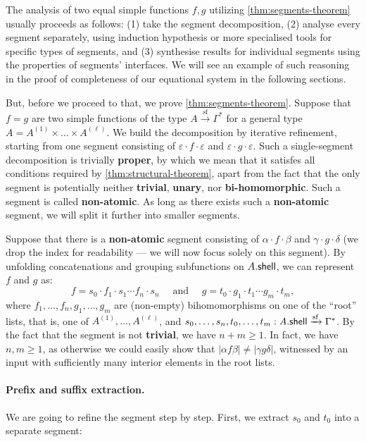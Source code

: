 The analysis of two equal simple functions $f,g$ utilizing \cref{thm:segments-theorem} usually proceeds as follows: (1) take the segment decomposition, (2) analyse every segment separately, using induction hypothesis or more specialised tools for specific types of segments, and (3) synthesise results for individual segments using the properties of segments' interfaces. We will see an example of such reasoning in the proof of completeness of our equational system in the following sections.

But, before we proceed to that, we prove \cref{thm:segments-theorem}. Suppose that $f = g$ are two simple functions of the type $A \xrightarrow{\mathrm{sf}} \Gamma^*$ for a general type $A = A^{(1)} \times \dots \times A^{(\ell)}$. We build the decomposition by iterative refinement, starting from one segment consisting of $\varepsilon \cdot f \cdot \varepsilon$ and $\varepsilon \cdot g \cdot \varepsilon$. Such a single-segment decomposition is trivially \textbf{proper}, by which we mean that it satisfes all conditions required by \cref{thm:structural-theorem}, apart from the fact that the only segment is potentially neither \textbf{trivial}, \textbf{unary}, nor \textbf{bi-homomorphic}. Such a segment is called \textbf{non-atomic}. As long as there exists such a \textbf{non-atomic} segment, we will split it further into smaller segments.

Suppose that there is a \textbf{non-atomic} segment consisting of $\alpha \cdot f \cdot \beta$ and $\gamma \cdot g \cdot \delta$ (we drop the index for readability --- we will now focus solely on this segment). By unfolding concatenations and grouping subfunctions on $A . \mathsf{shell}$, we can represent $f$ and $g$ as:
\[
    f = s_0 \cdot f_1 \cdot s_1 \cdots f_n \cdot s_n \quad \text{ and } \quad g = t_0 \cdot g_1 \cdot t_1 \cdots g_m \cdot t_m,
\]
where $f_1, \dots, f_n, g_1, \dots, g_m$ are (non-empty) bihomomorphisms on one of the ``root'' lists, that is, one of $A^{(1)}, \dots, A^{(\ell)}$, and $s_0, \dots, s_n, t_0, \dots, t_m : A . \mathsf{shell} \xrightarrow{\mathrm{sf}} \Gamma^*$. By the fact that the segment is not \textbf{trivial}, we have $n + m \geq 1$. In fact, we have $n,m \geq 1$, as otherwise we could easily show that $|\alpha f \beta| \neq |\gamma g \delta|$, witnessed by an input with sufficiently many interior elements in the root lists.

\paragraph{Prefix and suffix extraction.} We are going to refine the segment step by step. First, we extract $s_0$ and $t_0$ into a separate segment:

